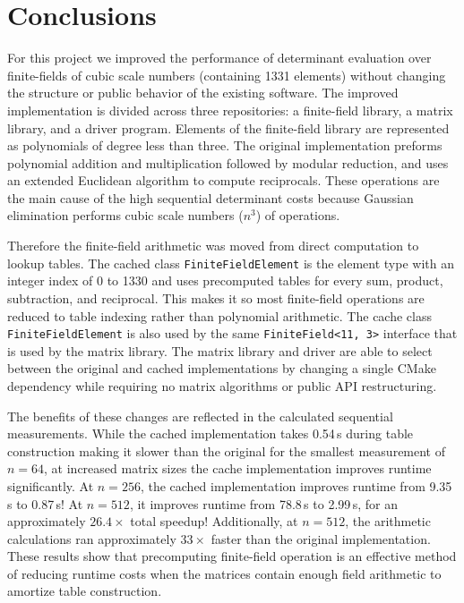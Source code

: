 \section{Conclusions}
\label{sec:conclusions}

For this project we improved the performance of determinant evaluation over finite-fields of cubic scale numbers (containing 1331 elements) without changing the structure or public behavior of the existing software.
The improved implementation is divided across three repositories: a finite-field library, a matrix library, and a driver program. Elements of the finite-field library are represented as polynomials of degree less than three.
The original implementation preforms polynomial addition and multiplication followed by modular reduction, and uses an extended Euclidean algorithm to compute reciprocals. These operations are the main cause of the high sequential determinant costs because Gaussian elimination performs cubic scale numbers (\(n^3\)) of operations.

Therefore the finite-field arithmetic was moved from direct computation to lookup tables. The cached class \texttt{FiniteFieldElement} is the element type with an integer index of 0 to 1330 and uses precomputed tables for every sum, product, subtraction, and reciprocal.
This makes it so most finite-field operations are reduced to table indexing rather than polynomial arithmetic.
The cache class \texttt{FiniteFieldElement} is also used by the same \texttt{FiniteField<11, 3>} interface that is used by the matrix library.
The matrix library and driver are able to select between the original and cached implementations by changing a single CMake dependency while requiring no matrix algorithms or public API restructuring.\

The benefits of these changes are reflected in the calculated sequential measurements.
While the cached implementation takes 0.54\,s during table construction making it slower than the original for the smallest measurement of \(n=64\), at increased matrix sizes the cache implementation improves runtime significantly.
At \(n=256\), the cached implementation improves runtime from 9.35\,s to 0.87\,s!
At \(n=512\), it improves runtime from 78.8\,s to 2.99\,s, for an approximately \(26.4\times\) total speedup!
Additionally, at \(n=512\), the arithmetic calculations ran approximately \(33\times\) faster than the original
implementation. These results show that precomputing finite-field operation is an effective method of reducing runtime costs when the matrices contain enough field arithmetic to amortize table construction.

